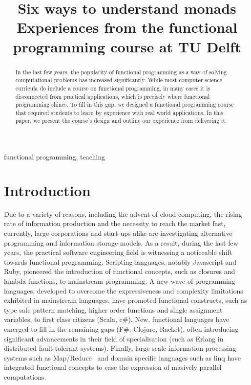\documentclass[conference]{IEEEtran}
\begin{document}
\title{Six ways to understand monads\\
\small{Experiences from the functional programming course at TU Delft}}

\author{
}
\maketitle

\begin{abstract}

  In the last few years, the popularity of functional programming as a way of
  solving computational problems has increased significantly. While most
  computer science curricula do include a course on functional programming, in
  many cases it is disconnected from practical applications, which is
  precisely where functional programming shines. To fill in this gap, we
  designed a functional programming course that  required students to
  learn by experience with real world applications. In this paper, we present
  the course's design and outline our experience from delivering it.

\end{abstract}

\begin{IEEEkeywords}
functional programming, teaching
\end{IEEEkeywords}

\section{Introduction}

Due to a variety of reasons, including the advent of cloud computing, the rising
rate of information production and the necessity to reach the market fast,
currently, large corporations and start-ups alike are investigating alternative
programming and information storage models. As a result, during the last few
years, the practical software engineering field is witnessing a noticeable shift
towards functional programming. Scripting languages, notably Javascript and
Ruby, pioneered the introduction of functional concepts, such as closures and
lambda functions, to mainstream programming. A new wave of programming
languages, developed to overcome the expressiveness and complexity limitations
exhibited in mainstream languages, have promoted functional constructs, such as
type safe pattern matching, higher order functions and single assignment
variables, to first class citizens (Scala, {\sc c\#}).  New, functional
languages have emerged to fill in the remaining gaps (F\#, Clojure, Racket),
often introducing significant advancements in their field of specialisation
(such as Erlang in distributed fault-tolerant systems).  Finally, large scale
information processing systems such as Map/Reduce~\cite{Dean04} and domain
specific languages such as {\sc linq} have integrated functional concepts to
ease the expression of masively parallel computations.
\end{document}
